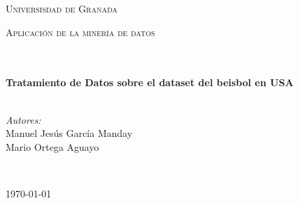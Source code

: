 \documentclass[10pt]{article}
\begin{document}
\begin{center}
\vspace*{0.5cm}								%
\textsc{\huge Universisdad de Granada}\\[1.5cm]	


\begin{minipage}{0.9\textwidth} 
\begin{center}																					%
\textsc{\LARGE Aplicación de la minería de datos}
\end{center}
\end{minipage}\\[0.5cm]
 			\vspace*{1cm}																		%
\HRule \\[0.4cm]																	%
{ \huge \bfseries Tratamiento de Datos sobre el dataset del beisbol en USA}\\[0.4cm]	%
\HRule \\[1.5cm]																	%
\begin{minipage}{0.46\textwidth}													%
\begin{flushleft} \large															%
\emph{Autores:}\\	
Manuel Jesús García Manday
\\Mario Ortega Aguayo
\end{flushleft}																		%
\end{minipage}		
\begin{minipage}{0.52\textwidth}		
\vspace{-0.6cm}											%
\begin{flushright} \large															%
\end{flushright}																	%
\end{minipage}	
\vspace*{1cm}
 	
 		\\																		%
\vspace{2cm} 																				
\begin{center}																					
{\large \today}																	%
 			\end{center}												  						
\end{center}							 											
																					
\end{document}

